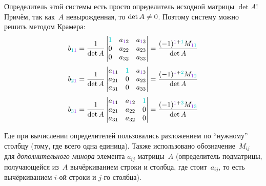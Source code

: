 \documentclass[a4paper,12pt]{article}
\theoremstyle{remark}
\begin{document}
  Определитель этой системы есть просто определитель исходной матрицы $\det A$!
  Причём, так как~$A$ невырожденная, то $\det A \hm{\not=} 0$.
  Поэтому систему можно решить методом Крамера:
  \[
    b_{\textcolor{light-cyan}{1}\textcolor{light-purple}{1}}
    = \frac{1}{\det A} \begin{vmatrix}
      \textcolor{light-cyan}{1} & a_{\textcolor{light-purple}{1}2} & a_{\textcolor{light-purple}{1}3}\\
      0                         & a_{22}                           & a_{23}\\
      0                         & a_{32}                           & a_{33}
    \end{vmatrix} = \frac{(-1)^{\textcolor{light-purple}{1}+\textcolor{light-cyan}{1}} M_{\textcolor{light-purple}{1}\textcolor{light-cyan}{1}}}{\det A}
  \]
  \[
    b_{\textcolor{light-cyan}{2}\textcolor{light-purple}{1}}
    = \frac{1}{\det A} \begin{vmatrix}
      a_{\textcolor{light-purple}{1}1} & \textcolor{light-cyan}{1} & a_{\textcolor{light-purple}{1}3}\\
      a_{21}                           & 0                         & a_{23}\\
      a_{31}                           & 0                         & a_{33}
    \end{vmatrix} = \frac{(-1)^{\textcolor{light-purple}{1}+\textcolor{light-cyan}{2}} M_{\textcolor{light-purple}{1}\textcolor{light-cyan}{2}}}{\det A}
  \]
  \[
    b_{\textcolor{light-cyan}{3}\textcolor{light-purple}{1}}
    = \frac{1}{\det A} \begin{vmatrix}
      a_{\textcolor{light-purple}{1}1} & a_{\textcolor{light-purple}{1}2} & \textcolor{light-cyan}{1}\\
      a_{21}                           & a_{22}                           & 0\\
      a_{31}                           & a_{32}                           & 0
    \end{vmatrix} = \frac{(-1)^{\textcolor{light-purple}{1}+\textcolor{light-cyan}{3}} M_{\textcolor{light-purple}{1}\textcolor{light-cyan}{3}}}{\det A}
  \]
  
  Где при вычислении определителей пользовались разложением по ``нужному'' столбцу (тому, где всего одна единица).
  Также использовано обозначение~$M_{ij}$ для \emph{дополнительного минора} элемента $a_{ij}$ матрицы~$A$ (определитель подматрицы, получающейся из~$A$ вычёркиванием строки и столбца, где стоит~$a_{ij}$, то есть вычёркиванием $i$-ой строки и $j$-го столбца).\
  
\end{document}
